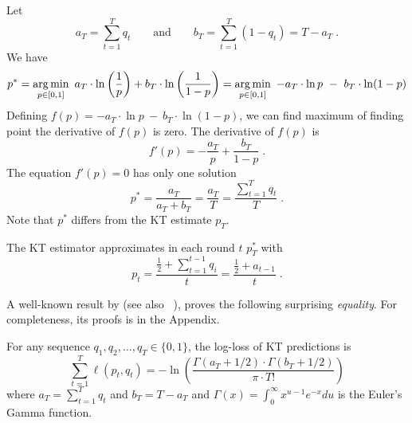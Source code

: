 Let
$$
a_T = \sum_{t=1}^T q_t \qquad \text{and} \qquad b_T = \sum_{t=1}^T (1 - q_t) = T - a_T \; .
$$
We have
\begin{align*}
p^*
= \operatorname*{arg\,min}_{p \in [0,1]} \ a_T \cdot  \ln \left( \frac{1}{p} \right) + b_T \cdot \ln \left( \frac{1}{1-p} \right)
= \operatorname*{arg\,min}_{p \in [0,1]} \ - a_T \cdot  \ln p \ - \  b_T \cdot \ln (1-p)
\end{align*}
Defining $f(p) = - a_T \cdot  \ln p \ - \  b_T \cdot \ln(1-p)$, we can find maximum of
finding point the derivative of $f(p)$ is zero. The derivative of $f(p)$ is
$$
f'(p) = - \frac{a_T}{p} + \frac{b_T}{1-p} \; .
$$
The equation $f'(p) = 0$ has only one solution
$$
p^* = \frac{a_T}{a_T + b_T} = \frac{a_T}{T} = \frac{\sum_{t=1}^T q_t}{T} \; .
$$
Note that $p^*$ differs from the KT estimate $p_T$.



The \ac{KT} estimator approximates in each round $t$ $p^*_T$ with
$$
p_t = \frac{\frac{1}{2} + \sum_{t=1}^{t-1} q_i}{t} = \frac{\frac{1}{2} + a_{t-1}}{t} \; .
$$

A well-known result by \citep{KrichevskyT81} (see also ~\cite{Cesa-BianchiL06}), proves the following surprising \emph{equality}.
For completeness, its proofs is in the Appendix.
\begin{lemma}
\label{lemma:kt}
For any sequence $q_1, q_2, \dots, q_T \in \{0,1\}$, the log-loss of KT
predictions is
$$
\sum_{t=1}^T \ell(p_t, q_t) =  - \ln \left( \frac{\Gamma(a_T + 1/2) \cdot \Gamma(b_T + 1/2)}{\pi \cdot T!} \right)
$$
where $a_T = \sum_{t=1}^T q_t$ and $b_T = T - a_T$ and $\Gamma(x) =
\int_0^\infty x^{u-1} e^{-x} du$ is the Euler's Gamma function.
\end{lemma}

% 
% 



